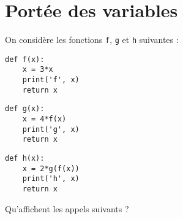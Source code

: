 \documentclass[11pt,a4paper]{article}
\begin{document}
\section{Portée des variables}
On considère les fonctions {\tt f}, {\tt g} et {\tt h} suivantes :
\begin{center}
\begin{py}{4cm}
\begin{verbatim}
def f(x):
    x = 3*x
    print('f', x)
    return x
\end{verbatim}
\end{py}\hspace*{1cm}
\begin{py}{4cm}
\begin{verbatim}
def g(x):
    x = 4*f(x)
    print('g', x)
    return x
\end{verbatim}
\end{py}\hspace*{1cm}
\begin{py}{4cm}
\begin{verbatim}
def h(x):
    x = 2*g(f(x))
    print('h', x)
    return x
\end{verbatim}
\end{py}
\end{center}

Qu'affichent les appels suivants ?
\vspace*{2mm}
\end{document}
